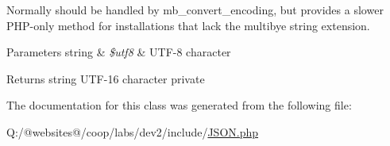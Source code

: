 Normally should be handled by mb\-\_\-convert\-\_\-encoding, but provides a slower P\-H\-P-\/only method for installations that lack the multibye string extension.


\begin{DoxyParams}[1]{Parameters}
string & {\em \$utf8} & U\-T\-F-\/8 character \\
\hline
\end{DoxyParams}
\begin{DoxyReturn}{Returns}
string U\-T\-F-\/16 character  private 
\end{DoxyReturn}


The documentation for this class was generated from the following file\-:\begin{DoxyCompactItemize}
\item 
Q\-:/@websites@/coop/labs/dev2/include/\hyperlink{include_2json_8php}{J\-S\-O\-N.\-php}\end{DoxyCompactItemize}
